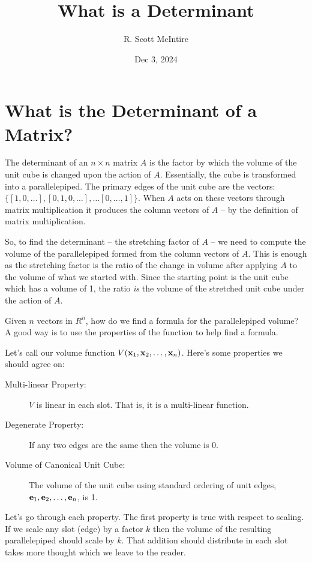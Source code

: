 \documentclass{article}
\title{What is a Determinant}
\author{R. Scott McIntire}
\date{Dec 3, 2024}
\begin{document}
\maketitle

\section{What is the Determinant of a Matrix?}
The determinant of an $n\times n$ matrix $A$ is the factor by which the volume of
the unit cube is changed upon the action of $A$. Essentially, the cube is
transformed into a parallelepiped. The primary edges of the unit cube are the
vectors: $\{ [1, 0, \ldots], [0, 1, 0, \ldots], \ldots [0, \dots, 1]\}$.
When $A$ acts on these vectors through matrix multiplication it
produces the column vectors of $A$ -- by the definition of matrix multiplication.

So, to find the determinant -- the stretching factor of $A$ -- we need to compute the volume of the parallelepiped formed
from the column vectors of $A$. This is enough as the stretching factor is the ratio of the 
change in volume after applying $A$ to the volume of what we started with.  Since the starting 
point is the unit cube which has a volume of 1, the ratio {\em is\/} the volume of the stretched unit cube
under the action of $A$.

Given $n$ vectors in $R^n$, how do we find a formula for the parallelepiped volume?
A good way is to use the properties of the function to help find a formula.

Let's call our volume function $V({\bf x}_1, {\bf x}_2, \ldots, {\bf x}_n)$.
Here's some properties we should agree on:
\begin{description}
\item[Multi-linear Property:]{$V$ is linear in each slot. That is,
    it is a multi-linear function.}
\item[Degenerate Property:]{If any two edges are the same then the volume is $0$.}
\item[Volume of Canonical Unit Cube:]{The volume of the unit cube using
    standard ordering of unit edges, ${\bf e}_1, {\bf e}_2, \ldots , {\bf e}_n$, is 1.}
\end{description}
Let's go through each property.
The first property is true with respect to scaling. If we scale any slot
(edge) by a factor
$k$ then the volume of the resulting parallelepiped should scale by $k$.
That addition should distribute in each slot takes more thought which we leave
to the reader.
\end{document}
